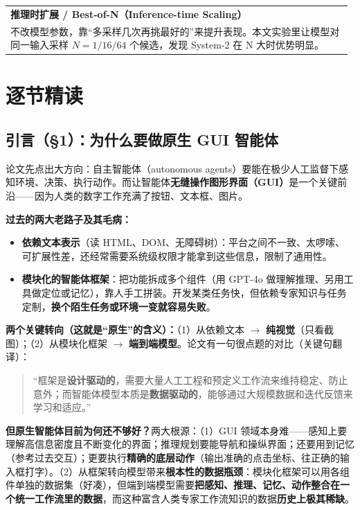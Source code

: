 \documentclass[11pt,UTF8,fontset=fandol]{ctexart}
\makeatletter
\newenvironment{kcard}[1]{%
  \par\smallskip\noindent
  \begin{tabular}{@{}p{0.985\linewidth}@{}}
  \rule{0pt}{1.1em}\textbf{\textcolor{cardline}{#1}}\\[0.2em]
}{%
  \\[0.3em]\end{tabular}\par\smallskip
}
\makeatother
\begin{document}
\begin{kcard}{推理时扩展 / Best-of-N（Inference-time Scaling）}
不改模型参数，靠“多采样几次再挑最好的”来提升表现。本文实验里让模型对同一输入采样 $N=1/16/64$ 个候选，发现 System-2 在 N 大时优势明显。
\end{kcard}

\section{逐节精读}

\subsection{引言（§1）：为什么要做原生 GUI 智能体}

论文先点出大方向：自主智能体（autonomous agents）要能在极少人工监督下感知环境、决策、执行动作。而让智能体\textbf{无缝操作图形界面（GUI）}是一个关键前沿——因为人类的数字工作充满了按钮、文本框、图片。

\textbf{过去的两大老路子及其毛病：}
\begin{itemize}[leftmargin=1.5em]
\item \textbf{依赖文本表示}（读 HTML、DOM、无障碍树）：平台之间不一致、太啰嗦、可扩展性差，还经常需要系统级权限才能拿到这些信息，限制了通用性。
\item \textbf{模块化的智能体框架}：把功能拆成多个组件（用 GPT-4o 做理解推理、另用工具做定位或记忆），靠人手工拼装。开发某类任务快，但依赖专家知识与任务定制，\textbf{换个陌生任务或环境一变就容易失败}。
\end{itemize}

\textbf{两个关键转向（这就是“原生”的含义）：}（1）从依赖文本 $\rightarrow$ \textbf{纯视觉}（只看截图）；（2）从模块化框架 $\rightarrow$ \textbf{端到端模型}。论文有一句很点题的对比（关键句翻译）：

\begin{quote}\small
“框架是\textbf{设计驱动的}，需要大量人工工程和预定义工作流来维持稳定、防止意外；而智能体模型本质是\textbf{数据驱动的}，能够通过大规模数据和迭代反馈来学习和适应。”
\end{quote}

\textbf{但原生智能体目前为何还不够好？}两大根源：（1）GUI 领域本身难——感知上要理解高信息密度且不断变化的界面；推理规划要能导航和操纵界面；还要用到记忆（参考过去交互）；更要执行\textbf{精确的底层动作}（输出准确的点击坐标、往正确的输入框打字）。（2）从框架转向模型带来\textbf{根本性的数据瓶颈}：模块化框架可以用各组件单独的数据集（好凑），但端到端模型需要\textbf{把感知、推理、记忆、动作整合在一个统一工作流里的数据}，而这种富含人类专家工作流知识的数据\textbf{历史上极其稀缺}。
\end{document}
